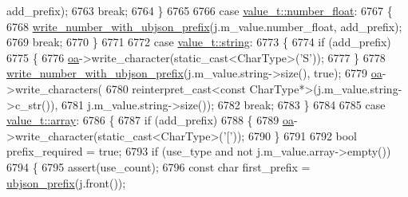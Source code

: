 \begin{DoxyCode}
      add\_prefix);
6763                 \textcolor{keywordflow}{break};
6764             \}
6765 
6766             \textcolor{keywordflow}{case} \hyperlink{namespacenlohmann_1_1detail_a1ed8fc6239da25abcaf681d30ace4985ad9966ecb59667235a57b4b999a649eef}{value\_t::number\_float}:
6767             \{
6768                 \hyperlink{classnlohmann_1_1detail_1_1binary__writer_a6a40756933ccc4f69e3d885fe2e9032b}{write\_number\_with\_ubjson\_prefix}(j.m\_value.number\_float, 
      add\_prefix);
6769                 \textcolor{keywordflow}{break};
6770             \}
6771 
6772             \textcolor{keywordflow}{case} \hyperlink{namespacenlohmann_1_1detail_a1ed8fc6239da25abcaf681d30ace4985ab45cffe084dd3d20d928bee85e7b0f21}{value\_t::string}:
6773             \{
6774                 \textcolor{keywordflow}{if} (add\_prefix)
6775                 \{
6776                     \hyperlink{classnlohmann_1_1detail_1_1binary__writer_a6f15b782a7900f50ef37d123008e601b}{oa}->write\_character(static\_cast<CharType>(\textcolor{charliteral}{'S'}));
6777                 \}
6778                 \hyperlink{classnlohmann_1_1detail_1_1binary__writer_a6a40756933ccc4f69e3d885fe2e9032b}{write\_number\_with\_ubjson\_prefix}(j.m\_value.string->size(), \textcolor{keyword}{
      true});
6779                 \hyperlink{classnlohmann_1_1detail_1_1binary__writer_a6f15b782a7900f50ef37d123008e601b}{oa}->write\_characters(
6780                     reinterpret\_cast<const CharType*>(j.m\_value.string->c\_str()),
6781                     j.m\_value.string->size());
6782                 \textcolor{keywordflow}{break};
6783             \}
6784 
6785             \textcolor{keywordflow}{case} \hyperlink{namespacenlohmann_1_1detail_a1ed8fc6239da25abcaf681d30ace4985af1f713c9e000f5d3f280adbd124df4f5}{value\_t::array}:
6786             \{
6787                 \textcolor{keywordflow}{if} (add\_prefix)
6788                 \{
6789                     \hyperlink{classnlohmann_1_1detail_1_1binary__writer_a6f15b782a7900f50ef37d123008e601b}{oa}->write\_character(static\_cast<CharType>(\textcolor{charliteral}{'['}));
6790                 \}
6791 
6792                 \textcolor{keywordtype}{bool} prefix\_required = \textcolor{keyword}{true};
6793                 \textcolor{keywordflow}{if} (use\_type and not j.m\_value.array->empty())
6794                 \{
6795                     assert(use\_count);
6796                     \textcolor{keyword}{const} \textcolor{keywordtype}{char} first\_prefix = \hyperlink{classnlohmann_1_1detail_1_1binary__writer_a67e1f5bb505bf9269c1e1e71d389291d}{ubjson\_prefix}(j.front());

\end{DoxyCode}
